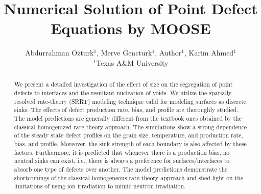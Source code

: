 \documentclass[a4paper]{article}
\title{Numerical Solution of Point Defect Equations by MOOSE}
\author{Abdurrahman Ozturk$^{1}$, Merve Gencturk$^{1}$, Author$^{1}$, Karim Ahmed$^{1}$  \\
        \small $^{1}$Texas A\&M University \\
}
\begin{document}
\maketitle

\begin{abstract}

We present a detailed investigation of the effect of size on the segregation of point defects to interfaces and the resultant nucleation of voids. We utilize the spatially-resolved rate-theory (SRRT) modeling technique valid for modeling surfaces as discrete sinks. The effects of defect production rate, bias, and profile are thoroughly studied. The model predictions are generally different from the textbook ones obtained by the classical homogenized rate theory approach. The simulations show a strong dependence of the steady state defect profiles on the grain size, temperature, and production rate, bias, and profile. Moreover, the sink strength of each boundary is also affected by these factors. Furthermore, it is predicted that whenever there is a production bias, no neutral sinks can exist, i.e., there is always a preference for surfaces/interfaces to absorb one type of defects over another. The model predictions demonstrate the shortcomings of the classical homogeneous rate-theory approach and shed light on the limitations of using ion irradiation to mimic neutron irradiation.


\end{abstract} \hspace{10pt}
\end{document}
